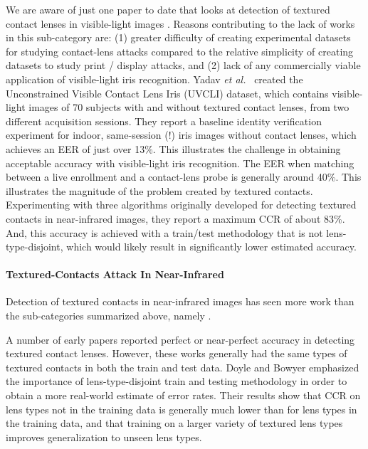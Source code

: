 \documentclass[format=acmsmall, review=false, timestamp=false]{acmart}
\newcommand{\etal}{{\it et al.}~}
\begin{document}
We are aware of just one paper to date that looks at detection of textured contact lenses in visible-light images \cite{Yadav_IJCB_2017}. Reasons contributing to the lack of works in this sub-category are: (1) greater difficulty of creating experimental datasets for studying contact-lens attacks compared to the relative simplicity of creating datasets to study print / display attacks, and (2) lack of any commercially viable application of visible-light iris recognition. Yadav \etal \cite{Yadav_IJCB_2017} created the Unconstrained Visible Contact Lens Iris ({\sf UVCLI}) dataset, which contains visible-light images of 70 subjects with and without textured contact lenses, from two different acquisition sessions. They report a baseline identity verification experiment for indoor, same-session (!) iris images without contact lenses, which achieves an EER of just over 13\%. This illustrates the challenge in obtaining acceptable accuracy with visible-light iris recognition. The EER when matching between a live enrollment and a contact-lens probe is generally around 40\%. This illustrates the magnitude of the problem created by textured contacts. Experimenting with three algorithms originally developed for detecting textured contacts in near-{infrared} images, they report a maximum {CCR} of about 83\%. And, this accuracy is achieved with a train/test methodology that is not lens-type-disjoint{, which} would likely result in significantly lower estimated accuracy.

\paragraph{Textured-Contacts Attack In Near-{Infrared}}

Detection of textured contacts in near-{infrared} images has seen more work than the sub-categories summarized above, namely
\cite{Daugman_WMIP_2003,Doyle_ICB_2013,Doyle_BTAS_2013,Doyle_IEEEAccess_2015,Fathy_NRSC_2017,Gragnaniello_TIFS_2015,Gragnaniello_PRL_2016,Gragnaniello_SITIS_2014,Gragnaniello_SITIS_2016,He_ICB_2007,He_BTAS_2016,He_CCPR_2008,HeZhaofeng_ICB_2009,Kohli_ICB_2013,Komulainen_IJCB_2014,Lovish_CAIP_2015,Pala_CVPR_2017,Raghavendra_ESI_2014,Raghavendra_WACV_2017,Sequeira_IJCNN_2014,Silva_SIBGRAPI_2015,Sun_PAMI_2014,Tomeo-Reyes_ISIS_2013,Wei_CPR_2008,Yadav_TIFS_2014,Zhang_CPR_2010,Singh_ISBA_2018,Sequeira_VISAPPa_2014,Chen_WACV_2018}.

A number of early papers reported perfect or near-perfect accuracy in detecting textured contact lenses. However, these works generally had the same types of textured contacts in both the train and test data. Doyle and Bowyer \cite{Doyle_IEEEAccess_2015} emphasized the importance of lens-type-disjoint train and testing methodology in order to obtain a more real-world estimate of error rates. Their results show that {CCR} on lens types not in the training data is generally much lower than for lens types in the training data, and that training on a larger variety of textured lens types improves generalization to unseen lens types.
\end{document}
